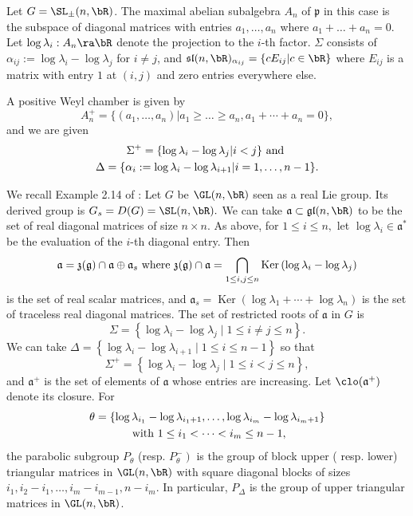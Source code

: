 Let $G = \SL_\pm(n, \bR)$. 
The maximal abelian subalgebra 
$A_n$ of $\mathfrak{p}$ in this case
is the subspace of diagonal matrices with 
entries $a_1, \dots, a_n$ where $a_1 + \dots + a_n = 0$. 
Let $\log \lambda_i: A_n\ra \bR$ denote the projection to the $i$-th factor. 
$\Sigma$ consists of $\alpha_{ij} :=\log \lambda_i -\log \lambda_j$ for $i\ne j$, 
and  $\mathfrak{sl}(n, \bR)_{\alpha_{ij}} = \{c E_{ij}| c\in \bR\}$ where $E_{ij}$ is a matrix with  entry $1$ at $(i, j)$ and zero entries everywhere else. 

A positive Weyl chamber is given by
\[A_n^{+} =\{(a_1, \dots, a_n)| a_1\geq \dots \geq a_n, a_1+\cdots + a_n = 0\},\]
and we are given 
\begin{gather*} 
\Sigma^+ = \{\log \lambda_i -\log \lambda_j | i < j\} \hbox{ and }\\ 
\Delta = \{\alpha_i:= \log \lambda_i -\log \lambda_{i+1} | i=1, \dots, n-1\}.
\end{gather*}  

We recall Example 2.14 of \cite{GGKW17ii}: 
Let $G$ be $\GL(n, \bR)$ seen as a real Lie group. Its derived group is $G_{s}=D(G)=\SL(n, \bR) .$ 
We can take %
$\mathfrak{a} \subset \mathfrak{g l}(n, \bR)$ to 
be the set of real diagonal matrices of size $n \times n$. 
As above, for $1 \leq i \leq n,$ let $\log \lambda_{i} \in \mathfrak{a}^{*}$ 
be the evaluation of the $i$-th diagonal entry. 
Then 
\[\mathfrak{a} =\mathfrak{z}(\mathfrak{g}) \cap \mathfrak{a} \oplus \mathfrak{a}_{s} 
\hbox{ where }
\mathfrak{z}(\mathfrak{g}) \cap \mathfrak{a}=\bigcap_{1 \leq i, j \leq n}  \operatorname{Ker}\left(\log \lambda_{i}-\log \lambda_{j}\right)\] 
is the set of real scalar matrices, and $\mathfrak{a}_{s}=
\operatorname{Ker}\left(\log \lambda_{1}+\cdots+\log \lambda_{n}\right)$ 
is the set of traceless real diagonal matrices. The set of restricted roots of $\mathfrak{a}$ in $G$ is
$$
\Sigma=\left\{\log \lambda_{i}-\log \lambda_{j} \mid 1 \leq i \neq j \leq n\right\}.
$$
We can take $\Delta=\left\{\log \lambda_{i}-\log \lambda_{i+1} \mid 1 \leq i \leq n-1\right\}$ so that
$$
\Sigma^{+}=\left\{\log \lambda_{i}-\log \lambda_{j} \mid 1 \leq i<j \leq n\right\},
$$
and $\mathfrak{a}^{+}$ is the set of elements of $\mathfrak{a}$ whose entries are increasing. 
Let $\clo({\mathfrak{a}}^+)$ denote its closure. 
For 
\begin{multline} 
\theta=\left\{\log \lambda_{i_{1}}-\log \lambda_{i_{1}+1}, \dots, \log \lambda_{i_{m}}-\log \lambda_{i_{m}+1}\right\} \\ 
\hbox{ with } 1 \leq i_{1}<\cdots<i_{m} \leq n-1,
\end{multline} 
the parabolic
subgroup $P_{\theta}$ (resp. $\left.P_{\theta}^{-}\right)$ is the group of block upper (
resp. lower) triangular matrices in $\GL(n,\bR)$ with square diagonal blocks 
of sizes $i_{1}, i_{2}-i_{1}, \dots, i_{m}-i_{m-1}, n-i_{m}$. 
In particular, $P_{\Delta}$ is the group of upper triangular matrices in $\GL(n, \bR)$.

